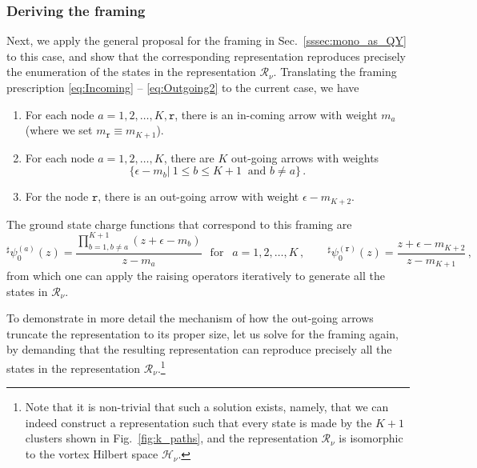 \documentclass[12pt,a4paper]{article}
\renewcommand{\(}{\left(}
\renewcommand{\)}{\right)}
\newcommand{\eps}{\epsilon}
\renewcommand{\(}{\left(}
\renewcommand{\)}{\right)}
\begin{document}
\subsubsection{Deriving the framing}

Next, we apply the general proposal for the  framing in  Sec.~\ref{sssec:mono_as_QY} to this case, and show that the corresponding representation reproduces precisely the enumeration of the states in the representation $\mathcal{R}_{\nu}$.
Translating the framing prescription \eqref{eq:Incoming} -- \eqref{eq:Outgoing2} to the current case, we have
\begin{enumerate}
\item For each node $a=1,2,\dots,K,\mathtt{r}$, there is an in-coming arrow with weight $m_a$ (where we set $m_{\mathtt{r}}\equiv m_{K+1}$).
\item For each node $a=1,2,\dots,K$, there are $K$ out-going arrows with weights 
\begin{equation}
\{\epsilon-m_b|\ 1\leq b\leq K+1\  \text{ and } b\neq a \}\,.
\end{equation}

\item For the node $\mathtt{r}$, there is an out-going arrow with weight $\epsilon-m_{K+2}$.	
\end{enumerate}
The ground state charge functions that correspond to this framing are
{\small
\begin{equation}
{}^\sharp\psi^{(a)}_0(z)=\frac{\prod_{b=1,b\neq a}^{K+1}(z+\eps-m_b)}{z-m_a}\,\ \text{ for }\  \ a=1,2,\dots,K\,,\qquad {}^\sharp\psi^{(\mathtt{r})}_0(z)=\frac{z+\eps-m_{K+2}}{z-m_{K+1}}\,,
\end{equation}
}
from which one can apply the raising operators iteratively to generate all the states in $\mathcal{R}_{\nu}$.

\medskip

To demonstrate in more detail the mechanism of how the out-going arrows truncate the representation to its proper size, let us solve for the framing again, by demanding that the resulting representation can reproduce precisely all the states in the representation $\mathcal{R}_{\nu}$.\footnote{Note that it is non-trivial that such a solution exists, namely, that we can indeed construct a representation such that every state is made by the $K+1$ clusters shown in Fig.~\ref{fig:k_paths}, and the representation $\mathcal{R}_\nu$ is isomorphic to the vortex Hilbert space $\mathcal{H}_\nu$.}
\end{document}
